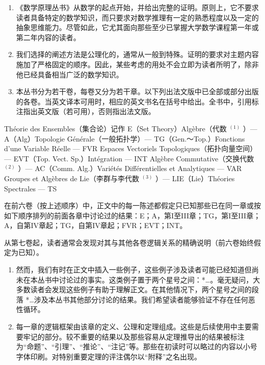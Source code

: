 
\begin{enumerate}
\def\labelenumi{\arabic{enumi}.}
\item
  《数学原理丛书》从数学的起点开始，并给出完整的证明。原则上，它不要求读者具备特定的数学知识，而只要求对数学推理有一定的熟悉程度以及一定的抽象思维能力。尽管如此，它尤其面向那些至少已掌握大学数学课程第一年或第二年内容的读者。
\item
  我们选择的阐述方法是公理化的，通常从一般到特殊。证明的要求对主题内容施加了严格固定的顺序。因此，某些考虑的用处不会立即为读者所明了，除非他已经具备相当广泛的数学知识。
\item
  本丛书分为若干卷，每卷又分为若干章。以下列出法文版中已全部或部分出版的各卷。当英文译本可用时，相应的英文书名在括号中给出。全书中，引用标注指出英文版（若可用），否则指出法文版。
\end{enumerate}

Théorie des Ensembles（集合论）记作 E（Set Theory）Algèbre（代数 \(^{(1)}\) ）--- A（Alg）Topologie Générale（一般拓扑学）--- TG（Gen.～Top.）Fonctions d'une Variable Réelle --- FVR Espaces Vectoriels Topologiques（拓扑向量空间）--- EVT（Top. Vect. Sp.）Intégration --- INT Algèbre Commutative（交换代数 \(^{(2)}\) ）--- AC（Comm. Alg.）Variétés Différentielles et Analytiques --- VAR Groupes et Algèbres de Lie（李群与李代数 \(^{(3)}\) ）--- LIE（Lie）Théories Spectrales --- TS

在前六卷（按上述顺序）中，正文中的每一陈述都假定只已知那些已在同一章或按如下顺序排列的前面各章中讨论过的结果：E；A，第I至III章；TG，第I至III章；A，自第IV章起；TG，自第IV章起；FVR；EVT；INT。

从第七卷起，读者通常会发现对其与其他各卷逻辑关系的精确说明（前六卷始终假定为已知）。

\begin{enumerate}
\def\labelenumi{\arabic{enumi}.}
\setcounter{enumi}{3}
\item
  然而，我们有时在正文中插入一些例子，这些例子涉及读者可能已经知道但尚未在本丛书中讨论过的事实。这类例子置于两个星号之间：*\ldots*。毫无疑问，大多数读者会发现这些例子有助于理解正文。在其他情况下，两个星号之间的段落 *\ldots* 涉及本丛书其他部分讨论的结果。我们希望读者能够验证不存在任何恶性循环。
\item
  每一章的逻辑框架由该章的定义、公理和定理组成。这些是后续使用中主要需要牢记的部分。较不重要的结果以及那些容易从定理推导出的结果被标注为“命题”、“引理”、“推论”、“注记”等。那些在初读时可以略过的内容以小号字体印刷。对特别重要定理的评注偶尔以“附释”之名出现。
\end{enumerate}

